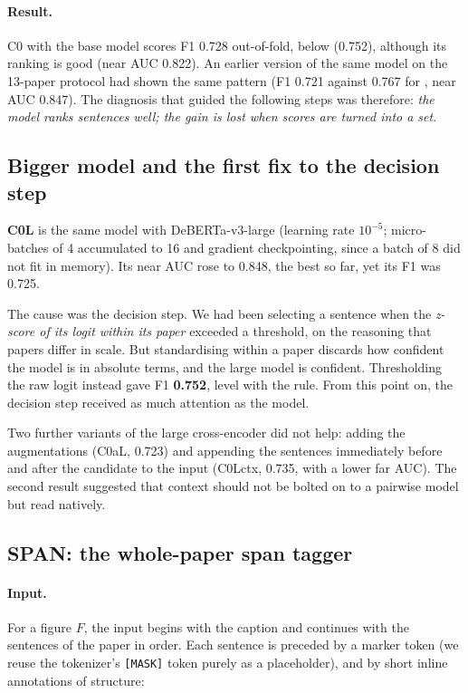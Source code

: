 \paragraph{Result.} C0 with the base model scores F1 0.728 out-of-fold, below \bof{} (0.752), although its
ranking is good (near AUC 0.822). An earlier version of the same model on the 13-paper protocol had shown
the same pattern (F1 0.721 against 0.767 for \bof{}, near AUC 0.847). The diagnosis that guided the following
steps was therefore: \emph{the model ranks sentences well; the gain is lost when scores are turned into a set}.

\subsection{Bigger model and the first fix to the decision step}
\textbf{C0L} is the same model with DeBERTa-v3-large (learning rate $10^{-5}$; micro-batches of 4 accumulated
to 16 and gradient checkpointing, since a batch of 8 did not fit in memory). Its near AUC rose to 0.848, the
best so far, yet its F1 was 0.725.

The cause was the decision step. We had been selecting a sentence when the \emph{z-score of its logit within
its paper} exceeded a threshold, on the reasoning that papers differ in scale. But standardising within a
paper discards how confident the model is in absolute terms, and the large model is confident. Thresholding
the raw logit instead gave F1 \textbf{0.752}, level with the rule.
From this point on, the decision step received as much attention as the model.

Two further variants of the large cross-encoder did not help: adding the augmentations (C0aL, 0.723) and
appending the sentences immediately before and after the candidate to the input (C0Lctx, 0.735, with a lower
far AUC). The second result suggested that context should not be bolted on to a pairwise model but read
natively.

\subsection{SPAN: the whole-paper span tagger}
\label{sec:span}
\paragraph{Input.} For a figure $F$, the input begins with the caption and continues with the sentences of the
paper in order. Each sentence is preceded by a marker token (we reuse the tokenizer's \texttt{[MASK]} token
purely as a placeholder), and by short inline annotations of structure:


